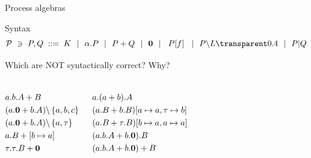 \documentclass[aspectratio=169]{beamer}
\begin{document}
\begin{slide}{Process algebras}
\small

\begin{block}{Syntax}
\begin{equation*}
\mathcal{P} ~\ni~ P,Q\; ::=\; K ~~|~~ \alpha.P ~~|~~ P + Q ~~|~~ \cnil
        ~~|~~ \crn P f  ~~|~~ P\backslash L \faded{~~|~~ P|Q}
\end{equation*}
\end{block}

\begin{exampleblock}{\exercise Which are NOT syntactically correct? Why?}
\begin{columns}
  \begin{align}
    & a.b.A+B\\&
    (a.\cnil + b.A) \backslash \set{a,b,c}\\&
    (a.\cnil + b.A) \backslash \set{a,\tau}\\& %
    a.B+[b\mapsto a]\\& %
    \tau.\tau.B + \cnil
  \end{align}

  \begin{align} &
    a.(a + b).A\\&
    (a.B + b.B)[a\mapsto a,\tau\mapsto b]\\&
    (a.B + \tau.B)[b\mapsto a,a\mapsto a]\\& %
    (a.b.A + b.\cnil).B\\&
    (a.b.A + b.\cnil)+B
  \end{align}
\end{columns}
\end{exampleblock}

\end{slide}

\end{document}
